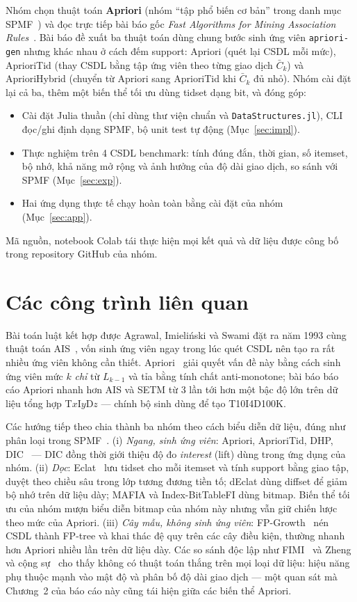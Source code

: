 \documentclass[10pt,twocolumn,letterpaper]{article}
\begin{document}
Nhóm chọn thuật toán \textbf{Apriori} (nhóm ``tập phổ biến cơ bản'' trong danh mục SPMF~\cite{spmf2016}) và đọc trực tiếp bài báo gốc \emph{Fast Algorithms for Mining Association Rules}~\cite{agrawal1994}. Bài báo đề xuất ba thuật toán dùng chung bước sinh ứng viên \texttt{apriori-gen} nhưng khác nhau ở cách đếm support: Apriori (quét lại CSDL mỗi mức), AprioriTid (thay CSDL bằng tập ứng viên theo từng giao dịch $\bar{C}_k$) và AprioriHybrid (chuyển từ Apriori sang AprioriTid khi $\bar{C}_k$ đủ nhỏ). Nhóm cài đặt lại cả ba, thêm một biến thể tối ưu dùng tidset dạng bit, và đóng góp:
\begin{itemize}
\item Cài đặt Julia thuần (chỉ dùng thư viện chuẩn và \texttt{DataStructures.jl}), CLI đọc/ghi định dạng SPMF, bộ unit test tự động (Mục~\ref{sec:impl}).
\item Thực nghiệm trên 4 CSDL benchmark: tính đúng đắn, thời gian, số itemset, bộ nhớ, khả năng mở rộng và ảnh hưởng của độ dài giao dịch, so sánh với SPMF (Mục~\ref{sec:exp}).
\item Hai ứng dụng thực tế chạy hoàn toàn bằng cài đặt của nhóm (Mục~\ref{sec:app}).
\end{itemize}
Mã nguồn, notebook Colab tái thực hiện mọi kết quả và dữ liệu được công bố trong repository GitHub của nhóm.

\section{Các công trình liên quan}
Bài toán luật kết hợp được Agrawal, Imieliński và Swami đặt ra năm 1993 cùng thuật toán AIS~\cite{agrawal1993}, vốn sinh ứng viên ngay trong lúc quét CSDL nên tạo ra rất nhiều ứng viên không cần thiết. Apriori~\cite{agrawal1994} giải quyết vấn đề này bằng cách sinh ứng viên mức $k$ \emph{chỉ} từ $L_{k-1}$ và tỉa bằng tính chất anti-monotone; bài báo báo cáo Apriori nhanh hơn AIS và SETM từ 3 lần tới hơn một bậc độ lớn trên dữ liệu tổng hợp T$x$I$y$D$z$ — chính bộ sinh dùng để tạo T10I4D100K.

Các hướng tiếp theo chia thành ba nhóm theo cách biểu diễn dữ liệu, đúng như phân loại trong SPMF~\cite{spmf2016}. (i) \emph{Ngang, sinh ứng viên}: Apriori, AprioriTid, DHP, DIC~\cite{brin1997} — DIC đồng thời giới thiệu độ đo \emph{interest} (lift) dùng trong ứng dụng của nhóm. (ii) \emph{Dọc}: Eclat~\cite{zaki2000} lưu tidset cho mỗi itemset và tính support bằng giao tập, duyệt theo chiều sâu trong lớp tương đương tiền tố; dEclat dùng diffset để giảm bộ nhớ trên dữ liệu dày; MAFIA và Index-BitTableFI dùng bitmap. Biến thể tối ưu của nhóm mượn biểu diễn bitmap của nhóm này nhưng vẫn giữ chiến lược theo mức của Apriori. (iii) \emph{Cây mẫu, không sinh ứng viên}: FP-Growth~\cite{han2000} nén CSDL thành FP-tree và khai thác đệ quy trên các cây điều kiện, thường nhanh hơn Apriori nhiều lần trên dữ liệu dày. Các so sánh độc lập như FIMI~\cite{goethals2003} và Zheng và cộng sự~\cite{zheng2001} cho thấy không có thuật toán thắng trên mọi loại dữ liệu: hiệu năng phụ thuộc mạnh vào mật độ và phân bố độ dài giao dịch — một quan sát mà Chương~2 của báo cáo này cũng tái hiện giữa các biến thể Apriori.
\end{document}
